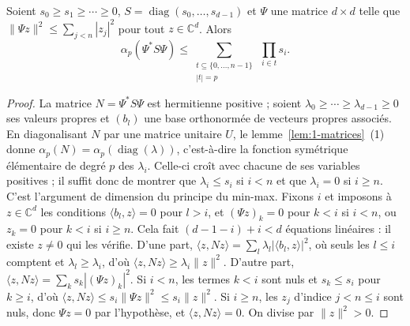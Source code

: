 \begin{lemme}[entrelacement]\label{lem:1-entrelacement}
Soient $s_0 \geq s_1 \geq \cdots \geq 0$, $S = \operatorname{diag}(s_0, \ldots, s_{d-1})$ et $\Psi$ une matrice $d \times d$ telle que $\|\Psi z\|^2 \leq \sum_{j<n} |z_j|^2$ pour tout $z \in \mathbb C^d$. Alors
\[
  \alpha_p(\Psi^* S \Psi) \leq \sum_{\substack{t \subseteq \{0, \ldots, n-1\} \\ |t| = p}} \ \prod_{i \in t} s_i .
\]
\end{lemme}

\begin{proof}
La matrice $N = \Psi^* S \Psi$ est hermitienne positive ; soient $\lambda_0 \geq \cdots \geq \lambda_{d-1} \geq 0$ ses valeurs propres et $(b_l)$ une base orthonormée de vecteurs propres associés. En diagonalisant $N$ par une matrice unitaire $U$, le lemme~\ref{lem:1-matrices}~(1) donne $\alpha_p(N) = \alpha_p(\operatorname{diag}(\lambda))$, c'est-à-dire la fonction symétrique élémentaire de degré $p$ des $\lambda_i$. Celle-ci croît avec chacune de ses variables positives ; il suffit donc de montrer que $\lambda_i \leq s_i$ si $i < n$ et que $\lambda_i = 0$ si $i \geq n$. C'est l'argument de dimension du principe du min-max. Fixons $i$ et imposons à $z \in \mathbb C^d$ les conditions $\langle b_l, z\rangle = 0$ pour $l > i$, et $(\Psi z)_k = 0$ pour $k < i$ si $i < n$, ou $z_k = 0$ pour $k < i$ si $i \geq n$. Cela fait $(d - 1 - i) + i < d$ équations linéaires : il existe $z \neq 0$ qui les vérifie. D'une part, $\langle z, Nz\rangle = \sum_l \lambda_l |\langle b_l, z\rangle|^2$, où seuls les $l \leq i$ comptent et $\lambda_l \geq \lambda_i$, d'où $\langle z, Nz\rangle \geq \lambda_i \|z\|^2$. D'autre part, $\langle z, Nz\rangle = \sum_k s_k |(\Psi z)_k|^2$. Si $i < n$, les termes $k < i$ sont nuls et $s_k \leq s_i$ pour $k \geq i$, d'où $\langle z, Nz\rangle \leq s_i \|\Psi z\|^2 \leq s_i \|z\|^2$. Si $i \geq n$, les $z_j$ d'indice $j < n \leq i$ sont nuls, donc $\Psi z = 0$ par l'hypothèse, et $\langle z, Nz\rangle = 0$. On divise par $\|z\|^2 > 0$.
\end{proof}

